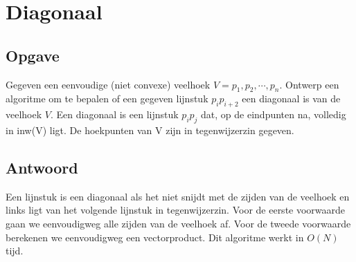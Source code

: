 \documentclass[examenvragen.tex]{subfiles}
\begin{document}
\section{Diagonaal}
\subsection{Opgave}
Gegeven een eenvoudige (niet convexe) veelhoek $V = p_1,p_2,\cdots,p_n$. Ontwerp een algoritme om te bepalen of een gegeven lijnstuk $p_i p_{i+2}$ een diagonaal is van de veelhoek $V$.
Een diagonaal is een lijnstuk $p_ip_j$ dat, op de eindpunten na, volledig in inw(V) ligt.  De hoekpunten van V zijn in tegenwijzerzin gegeven. 

\subsection{Antwoord}
Een lijnstuk is een diagonaal als het niet snijdt met de zijden van de veelhoek en links ligt van het volgende lijnstuk in tegenwijzerzin. Voor de eerste voorwaarde gaan we eenvoudigweg alle zijden van de veelhoek af. Voor de tweede voorwaarde berekenen we eenvoudigweg een vectorproduct. Dit algoritme werkt in $O(N)$ tijd.
\end{document}
